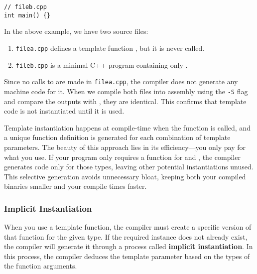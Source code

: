 \begin{lstlisting}[style=cxx]
// fileb.cpp
int main() {}
\end{lstlisting}


\begin{explanation}
\noindent
In the above example, we have two source files:

\begin{enumerate}
    \item \texttt{filea.cpp} defines a template function , but it is never called.
    \item \texttt{fileb.cpp} is a minimal C++ program containing only .
\end{enumerate}

\noindent
Since no calls to  are made in \texttt{filea.cpp}, the compiler does not generate any machine code for it.
When we compile both files into assembly using the \texttt{-S} flag and compare the outputs with , they are identical. This confirms that template code is not instantiated until it is used.
\end{explanation}

\noindent
Template instantiation happens at compile-time when the function is called, and a unique function definition is generated for each combination of template parameters.
The beauty of this approach lies in its efficiency—you only pay for what you use.
If your program only requires a  function for  and , the compiler generates code only for those types, leaving other potential instantiations unused.
This selective generation avoids unnecessary bloat, keeping both your compiled binaries smaller and your compile times faster.

\subsubsection{Implicit Instantiation}

\noindent
When you use a template function, the compiler must create a specific version of that function for the given type.
If the required instance does not already exist, the compiler will generate it through a process called \textbf{implicit instantiation}.
In this process, the compiler deduces the template parameter  based on the types of the function arguments.

